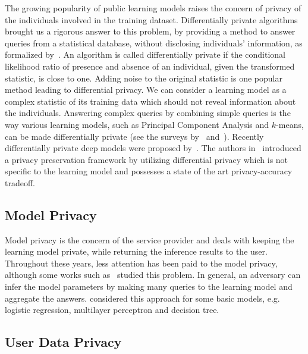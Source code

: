 \documentclass[10pt,journal,compsoc]{IEEEtran}
\begin{document}
The growing popularity of public learning models raises the concern of privacy of the individuals involved in the training dataset. Differentially private algorithms brought us a rigorous answer to this problem, by providing a method to answer queries from a statistical database, without disclosing individuals' information, as formalized by~\cite{dwork06}. An algorithm is called differentially private if the conditional likelihood ratio of presence and absence of an individual, given the transformed statistic, is close to one. Adding noise to the original statistic is one popular method leading to differential privacy. We can consider a learning model as a complex statistic of its training data which should not reveal information about the individuals. Answering complex queries by combining simple queries is the way various learning models, such as Principal Component Analysis and $k$-means, can be made differentially private (see the surveys by~\cite{dwork2008} and~\cite{ji2014}). Recently differentially private deep models were proposed by~\cite{abadi2016}. The authors in~\cite{papernot2016} introduced a privacy preservation framework by utilizing differential privacy which is not specific to the learning model and possesses a state of the art privacy-accuracy tradeoff.

\subsection{Model Privacy}

Model privacy is the concern of the service provider and deals with keeping the learning model private, while returning the inference results to the user. Throughout these years, less attention has been paid to the model privacy, although some works such as~\cite{tramer2016stealing} studied this problem. In general, an adversary can infer the model parameters by making many queries to the learning model and aggregate the answers. \cite{tramer2016stealing} considered this approach for some basic models, e.g. logistic regression, multilayer perceptron and decision tree. 

\subsection{User Data Privacy}
\end{document}
